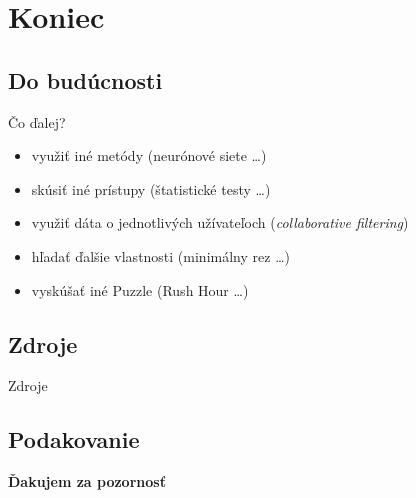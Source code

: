 \documentclass[xcolor={table}]{beamer}
\begin{document}
            
	\section{Koniec}
		\subsection{Do budúcnosti}
			\begin{frame}{Čo ďalej?}
				\begin{block}{}
					\begin{itemize}
						\item využiť iné metódy (neurónové siete \ldots)
						\item skúsiť iné prístupy (štatistické testy \ldots)
						\item využiť dáta o jednotlivých užívateľoch (\emph{collaborative filtering})
						\item hľadať ďalšie vlastnosti (minimálny rez \ldots)
						\item vyskúšať iné Puzzle (Rush Hour \ldots)
					\end{itemize}
				\end{block}
			\end{frame}
		\subsection{Zdroje}                
            \begin{frame}[allowframebreaks]{Zdroje}
			\footnotesize
				\nocite{*}
				
				 
            \end{frame}
	
        \subsection{Podakovanie}                
            \begin{frame}
				\vfill
				\begin{center}
					\huge\bfseries
					Ďakujem za pozornosť
					\vfill
				\end{center}
			\vfill
            \end{frame}
	\section{}
\end{document}
